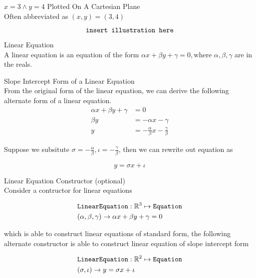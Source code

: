 \documentclass{book}
\begin{document}
  {\example $x = 3 \land y = 4$ Plotted On A Cartesian Plane \\
    Often abbreviated as $(x, y) = (3, 4)$

    $$\text{\texttt{insert illustration here}}$$
  }

  {\remark Linear Equation \\
    A linear equation is an equation of the form $\alpha x + \beta y + \gamma = 0, \text{where } \alpha, \beta, \gamma$ are in the reals.\\
  }

  {\remark Slope Intercept Form of a Linear Equation \\
    From the original form of the linear equation, we can derive the following alternate form of a linear equation.
    \begin{align*}
      \alpha x + \beta y + \gamma & = 0\\
      \beta y & = - \alpha x - \gamma\\
      y & = -\frac{\alpha}{\beta} x - \frac{\gamma}{\beta}
    \end{align*}

    Suppose we subsitute $\sigma = - \frac{\alpha}{\beta}, \iota = - \frac{\gamma}{\beta}$, then we can rewrite out equation as

    $$y = \sigma x + \iota$$
  }

  {\remark Linear Equation Constructor (optional) \\
    Consider a contructor for linear equations

    \begin{align*}
      & \text{\texttt{LinearEquation}}: \mathbb{R}^3 \mapsto \text{\texttt{Equation}}\\
      & (\alpha, \beta, \gamma) \to \alpha x + \beta y + \gamma = 0
    \end{align*}

    which is able to construct linear equations of standard form, the following alternate constructor is able to construct linear equation of slope intercept form

    \begin{align*}
      & \text{\texttt{LinearEquation}}: \mathbb{R}^2 \mapsto \text{\texttt{Equation}}\\
      & (\sigma, \iota) \to y = \sigma x + \iota
    \end{align*}
  }
\end{document}
